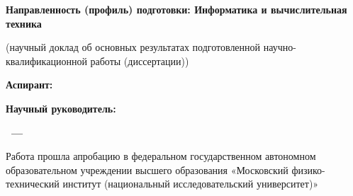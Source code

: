 \vspace{0pt plus0.5fill}
\noindent%
{\textbf{Направленность (профиль) подготовки: Информатика и вычислительная техника}

\vspace{0pt plus3fill} %

\begin{center}
\textbf {\Large %
\thesisTitle}


{(научный доклад об основных результатах подготовленной научно-квалификационной работы (диссертации))
}\par
\vspace{0pt plus1fill} %
\end{center}

\hspace{60mm}\textbf{Аспирант:}\par
\hspace{60mm}{\thesisAuthor}\par
    
\vspace{0pt plus1fill} 
\hspace{60mm}\textbf{Научный руководитель:}\par
\hspace{60mm}\supervisorRegalia\par
\hspace{60mm}\supervisorFio\par


\vspace{0pt plus4fill} %
{\centering\textbf{\thesisCity~--- \thesisYear}\par}

\newpage
\thispagestyle{empty}
Работа прошла апробацию в федеральном государственном автономном образовательном учреждении высшего образования «Московский физико-технический институт (национальный исследовательский университет)»

}
